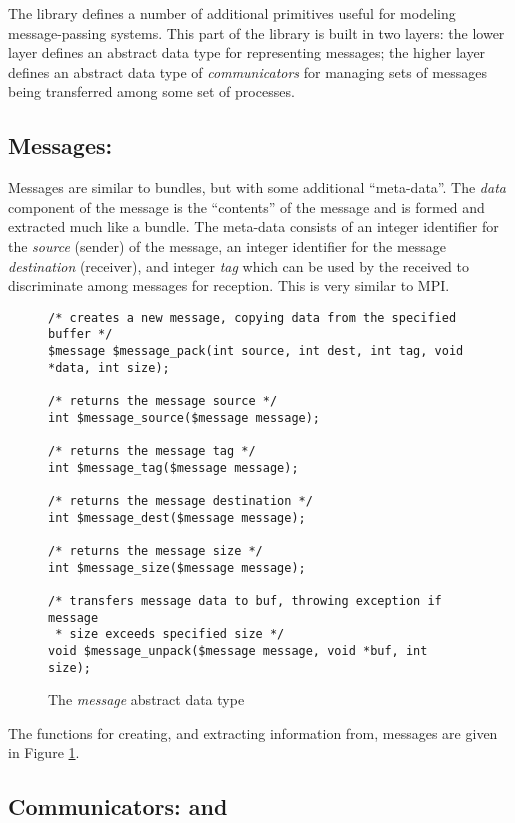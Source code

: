 The library defines a number of additional primitives useful for
modeling message-passing systems.  This part of the library is built
in two layers: the lower layer defines an abstract data type for
representing messages; the higher layer defines an abstract data type
of \emph{communicators} for managing sets of messages being
transferred among some set of processes.

\subsection{Messages: \cmessage}

Messages are similar to bundles, but with some additional
``meta-data''.  The \emph{data} component of the message is the
``contents'' of the message and is formed and extracted much like a
bundle.  The meta-data consists of an integer identifier for the
\emph{source} (sender) of the message, an integer identifier for the
message \emph{destination} (receiver), and integer \emph{tag} which
can be used by the received to discriminate among messages for
reception.  This is very similar to MPI.

\begin{figure}
  \begin{small}
\begin{verbatim}
/* creates a new message, copying data from the specified buffer */ 
$message $message_pack(int source, int dest, int tag, void *data, int size);

/* returns the message source */ 
int $message_source($message message);

/* returns the message tag */
int $message_tag($message message);

/* returns the message destination */ 
int $message_dest($message message);

/* returns the message size */ 
int $message_size($message message);

/* transfers message data to buf, throwing exception if message
 * size exceeds specified size */ 
void $message_unpack($message message, void *buf, int size);
\end{verbatim}
  \end{small}
  \caption{The \emph{message} abstract data type}
  \label{fig:message}
\end{figure}

The functions for creating, and extracting information from, messages
are given in Figure \ref{fig:message}.

\subsection{Communicators: \cgcomm{} and \ccomm}
\label{sec:communicators}

